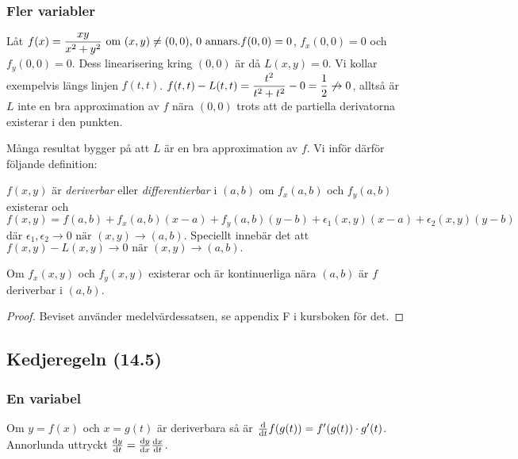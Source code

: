 \documentclass[a4paper]{article}
\begin{document}
\subsubsection{Fler variabler}
\begin{ex}
    Låt \(
        f(x) = \displaystyle\frac{xy}{x^2+y^2} \text{ om } (x,y) \neq (0,0)\text{, } 0 \text{ annars.}  
        f(0,0) = 0
    \), \(
        f_x(0,0) = 0
    \) och \(
        f_y(0,0) = 0
    \). Dess linearisering kring \(
        (0,0)
    \) är då \(
        L(x,y) = 0
    \). Vi kollar exempelvis längs linjen \(
        f(t,t)
    \). \(
        f(t,t) - L(t,t) = \displaystyle\frac{t^2}{t^2+t^2} - 0 = \frac{1}{2} \not\to 0
    \), alltså är \(
        L
    \) inte en bra approximation av \(
        f
    \) nära \(
        (0,0)
    \) trots att de partiella derivatorna existerar i den punkten.
\end{ex}

Många resultat bygger på att \(
    L
\) är en bra approximation av \(
    f
\). Vi inför därför följande definition: 
\begin{defn}
    \(
        f(x,y)
    \) är \emph{deriverbar} eller \emph{differentierbar} i \(
        (a,b)
    \) om \(
        f_x(a,b)
    \) och \(
        f_y(a,b)
    \) existerar och \(
        f(x,y) = f(a,b) + f_x(a,b)(x-a) + f_y(a,b) (y-b) + 
        \epsilon_1(x,y)(x-a) + \epsilon_2(x,y)(y-b)
    \) där \(
        \epsilon_1, \epsilon_2 \to 0 \text{ när } (x,y) \to (a,b).
    \) Speciellt innebär det att \(
        f(x,y) - L(x,y) \to 0 \text{ när } (x,y) \to (a,b).
    \) 
\end{defn}

\begin{sats}
    Om \(
        f_x(x,y)
    \) och \(
        f_y(x,y)
    \) existerar och är kontinuerliga nära \(
        (a,b)
    \) är \(
        f
    \) deriverbar i \(
        (a,b)
    \).

    \begin{proof}
        Beviset använder medelvärdessatsen, se appendix F i kursboken för det.
    \end{proof}
\end{sats}

\subsection{Kedjeregeln (14.5)}
\subsubsection{En variabel}
Om \(
    y = f(x)
\) och \(
    x = g(t)
\) är deriverbara så är \(
    \dv{t} f(g(t)) = f'(g(t)) \cdot g'(t)
\). Annorlunda uttryckt \(
    \dv{y}{t} = \dv{y}{x} \dv{x}{t}
\).
\end{document}
